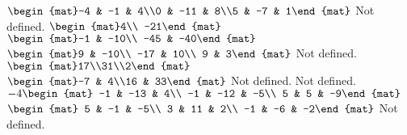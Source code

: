 \begin{Answer}
\begin{multicols}{2}
\Question $\begin{mat}-4 & -1 & 4\\0 & -11 & 8\\5 & -7 & 1\end{mat}$
\Question Not defined.
\Question $\begin{mat}4\\ -21\end{mat}$
\Question $\begin{mat}-1 & -10\\ -45 & -40\end{mat}$
\Question $\begin{mat}9 & -10\\ -17 & 10\\ 9 & 3\end{mat}$
\Question Not defined.
\Question $\begin{mat}17\\31\\2\end{mat}$
\Question $\begin{mat}-7 & 4\\16 & 33\end{mat}$
\Question Not defined.
\Question Not defined.
\Question $-4\begin{mat} -1 & -13 & 4\\ -1 & -12 & -5\\ 5 & 5 & -9\end{mat}$
\Question $\begin{mat} 5 & -1 & -5\\ 3 & 11 & 2\\ -1 & -6 & -2\end{mat}$
\Question Not defined.
\EndCurrentQuestion
\end{multicols}
\end{Answer}
